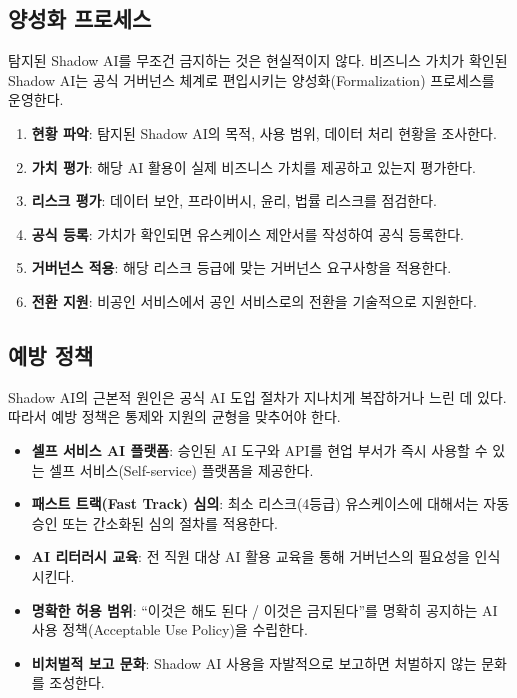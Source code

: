 \subsection{양성화 프로세스}
\label{sec:8.7.3}

탐지된 Shadow AI를 무조건 금지하는 것은 현실적이지 않다. 비즈니스 가치가 확인된 Shadow AI는 공식 거버넌스 체계로 편입시키는 양성화(Formalization) 프로세스를 운영한다.

\begin{enumerate}
    \item \textbf{현황 파악}: 탐지된 Shadow AI의 목적, 사용 범위, 데이터 처리 현황을 조사한다.
    \item \textbf{가치 평가}: 해당 AI 활용이 실제 비즈니스 가치를 제공하고 있는지 평가한다.
    \item \textbf{리스크 평가}: 데이터 보안, 프라이버시, 윤리, 법률 리스크를 점검한다.
    \item \textbf{공식 등록}: 가치가 확인되면 유스케이스 제안서를 작성하여 공식 등록한다.
    \item \textbf{거버넌스 적용}: 해당 리스크 등급에 맞는 거버넌스 요구사항을 적용한다.
    \item \textbf{전환 지원}: 비공인 서비스에서 공인 서비스로의 전환을 기술적으로 지원한다.
\end{enumerate}

\subsection{예방 정책}
\label{sec:8.7.4}

Shadow AI의 근본적 원인은 공식 AI 도입 절차가 지나치게 복잡하거나 느린 데 있다. 따라서 예방 정책은 통제와 지원의 균형을 맞추어야 한다.

\begin{itemize}
    \item \textbf{셀프 서비스 AI 플랫폼}: 승인된 AI 도구와 API를 현업 부서가 즉시 사용할 수 있는 셀프 서비스(Self-service) 플랫폼을 제공한다.
    \item \textbf{패스트 트랙(Fast Track) 심의}: 최소 리스크(4등급) 유스케이스에 대해서는 자동 승인 또는 간소화된 심의 절차를 적용한다.
    \item \textbf{AI 리터러시 교육}: 전 직원 대상 AI 활용 교육을 통해 거버넌스의 필요성을 인식시킨다.
    \item \textbf{명확한 허용 범위}: ``이것은 해도 된다 / 이것은 금지된다''를 명확히 공지하는 AI 사용 정책(Acceptable Use Policy)을 수립한다.
    \item \textbf{비처벌적 보고 문화}: Shadow AI 사용을 자발적으로 보고하면 처벌하지 않는 문화를 조성한다.
\end{itemize}

